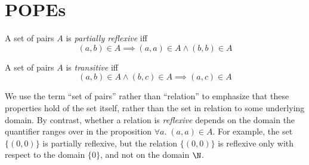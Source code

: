 \documentclass{article}
\newcommand{\ale}{\sqsubseteq}
\newcommand{\eqposet}[1]{\ms{Eq}(#1)}
\renewcommand{\eqposet}[1]{\|{#1}\|}
\newcommand{\eqclass}[1]{[#1]}
\newcommand{\height}{\ms{height}}
\newcommand{\elemheight}[2]{\height(#2 : #1)}
\newcommand{\down}[2]{\mathop{\downarrow}(#2 : #1)}
\begin{document}



\section{POPEs}

\begin{definition}
  A set of pairs $A$ is \emph{partially reflexive} iff
  \[ (a,b) \in A \implies (a,a) \in A \wedge (b,b) \in A \]
\end{definition}

\begin{definition}
  A set of pairs $A$ is \emph{transitive} iff
  \[ (a,b) \in A \wedge (b,c) \in A \implies (a,c) \in A\]
\end{definition}

We use the term ``set of pairs'' rather than ``relation'' to emphasize that
these properties hold of the set itself, rather than the set in relation to some
underlying domain. By contrast, whether a relation is \emph{reflexive} depends
on the domain the quantifier ranges over in the proposition $\forall a.\; (a,a)
\in A$. For example, the set $\{(0,0)\}$ is partially reflexive, but the
relation $\{(0,0)\}$ is reflexive only with respect to the domain $\{0\}$, and
not on the domain $\N$.
\end{document}
